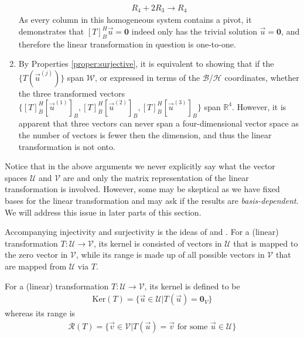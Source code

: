 \begin{solution}
\begin{enumerate}[label=(\alph*)]
\begin{align*}
    R_4 + 2R_3 \to R_4
    \end{align*}
    As every column in this homogeneous system contains a pivot, it demonstrates that $[T]_B^H\vec{u} = \textbf{0}$ indeed only has the trivial solution $\vec{u} = \textbf{0}$, and therefore the linear transformation in question is one-to-one.
    \item By Properties \ref{proper:surjective}, it is equivalent to showing that if the $\{T(\vec{u}^{(j)})\}$ span $\mathcal{W}$, or expressed in terms of the $\mathcal{B}$/$\mathcal{H}$ coordinates, whether the three transformed vectors $\{[T]_B^H[\vec{u}^{(1)}]_B, [T]_B^H[\vec{u}^{(2)}]_B, [T]_B^H[\vec{u}^{(3)}]_B\}$ span $\mathbb{R}^4$. However, it is apparent that three vectors can never span a four-dimensional vector space as the number of vectors is fewer then the dimension, and thus the linear transformation is not onto.
\end{enumerate}
Notice that in the above arguments we never explicitly say what the vector spaces $\mathcal{U}$ and $\mathcal{V}$ are and only the matrix representation of the linear transformation is involved. However, some may be skeptical as we have fixed bases for the linear transformation and may ask if the results are \textit{basis-dependent}. We will address this issue in later parts of this section.
\end{solution}
Accompanying injectivity and surjectivity is the ideas of  and . For a (linear) transformation $T: \mathcal{U} \to \mathcal{V}$, its kernel is consisted of vectors in $\mathcal{U}$ that is mapped to the zero vector in $\mathcal{V}$, while its range is made up of all possible vectors in $\mathcal{V}$ that are mapped from $\mathcal{U}$ via $T$.
\begin{defn}
\label{defn:kernelrange}
For a (linear) transformation $T: \mathcal{U} \to \mathcal{V}$, its kernel is defined to be
\begin{align*}
\text{Ker}(T) = \{\vec{u} \in \mathcal{U} | T(\vec{u}) = \textbf{0}_V\}
\end{align*}
whereas its range is
\begin{align*}
\mathcal{R}(T) = \{\vec{v} \in \mathcal{V} | T(\vec{u}) = \vec{v} \text{ for some } \vec{u} \in \mathcal{U}\}    
\end{align*}
\end{defn}
